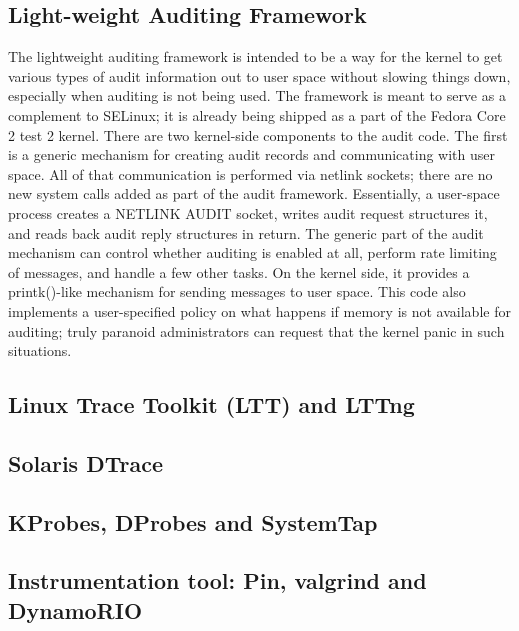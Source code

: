 \subsection{Light-weight Auditing Framework}

The lightweight auditing framework is intended to be a way for the kernel to
get various types of audit information out to user space without slowing things
down, especially when auditing is not being used. The framework is meant to
serve as a complement to SELinux; it is already being shipped as a part of the
Fedora Core 2 test 2 kernel. There are two kernel-side components to the audit
code. The first is a generic mechanism for creating audit records and
communicating with user space. All of that communication is performed via
netlink sockets; there are no new system calls added as part of the audit
framework. Essentially, a user-space process creates a NETLINK AUDIT socket,
writes audit request structures it, and reads back audit reply structures in
return. The generic part of the audit mechanism can control whether auditing is
enabled at all, perform rate limiting of messages, and handle a few other
tasks. On the kernel side, it provides a printk()-like mechanism for sending
messages to user space. This code also implements a user-specified policy on
what happens if memory is not available for auditing; truly paranoid
administrators can request that the kernel panic in such situations.

\subsection{Linux Trace Toolkit (LTT) and LTTng}

\subsection{Solaris DTrace}

\subsection{KProbes, DProbes and SystemTap}

\subsection{Instrumentation tool: Pin, valgrind and DynamoRIO}
